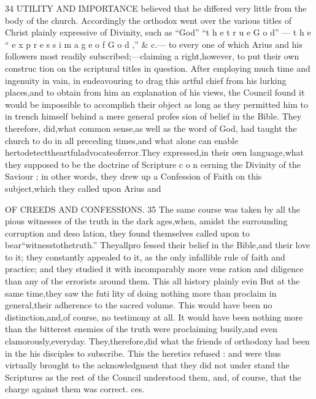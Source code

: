 \documentclass[
]{book}
\begin{document}
34 UTILITY AND IMPORTANCE
believed that he differed very little from the body of the church. Accordingly the orthodox went over the various titles of Christ plainly expressive of Divinity, such as ``God''
``t h e t r u e G o d'' --- t h e `` e x p r e s s i m a g e o f G o d ,'' \& c.--- to every one of which Arius and his followers most readily subscribed;---claiming a right,however, to put their own construc tion on the scriptural titles in question. After employing much time and ingenuity in vain, in endeavouring to drag this artful chief from his lurking places,and to obtain from him an explanation of his views, the Council found it would be impossible to accomplish their object as long as they permitted him to in trench himself behind a mere general profes
sion of belief in the Bible. They therefore, did,what common sense,as well as the word of God, had taught the church to do in all preceding times,and what alone can enable hertodetecttheartfuladvocateoferror.They expressed,in their own language,what they supposed to be the doctrine of Scripture c o n cerning the Divinity of the Saviour ; in other words, they drew up a Confession of Faith on this subject,which they called upon Arius and

OF CREEDS AND CONFESSIONS. 35
The same course was taken by all the pious witnesses of the truth in the dark ages,when,
amidst the surrounding corruption and deso
lation, they found themselves called upon to bear``witnesstothetruth.'' Theyallpro
fessed their belief in the Bible,and their love to it; they constantly appealed to it, as the only infallible rule of faith and practice; and they studied it with incomparably more vene ration and diligence than any of the errorists around them. This all history plainly evin
But at the same time,they saw the futi lity of doing nothing more than proclaim in general,their adherence to the sacred volume. This would have been no distinction,and,of course, no testimony at all. It would have been nothing more than the bitterest enemies
of the truth were proclaiming busily,and even clamorously,everyday. They,therefore,did
what the friends of orthodoxy had been in the
his disciples to subscribe. This the heretics
refused : and were thus virtually brought to
the acknowledgment that they did not under stand the Scriptures as the rest of the Council understood them, and, of course, that the charge against them was correct.
ces.
\end{document}
